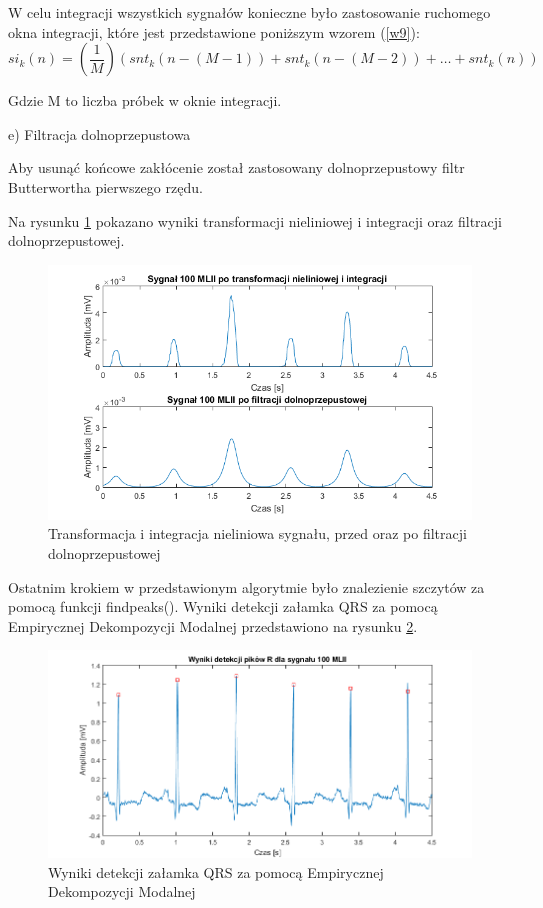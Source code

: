 \documentclass[10pt,a4paper]{article}
\begin{document}
W celu integracji wszystkich sygnałów konieczne było zastosowanie ruchomego
okna integracji, które jest przedstawione poniższym wzorem (\ref{w9}):
\begin{equation}
\label{w10}
si_k(n)=(\frac{1}{M})(snt_k(n-(M-1)) + snt_k(n-(M-2)) + \ldots + snt_k(n))
\end{equation}

Gdzie M to liczba próbek w oknie integracji.


e) Filtracja dolnoprzepustowa

Aby usunąć końcowe zakłócenie został zastosowany dolnoprzepustowy filtr
Butterwortha pierwszego rzędu.

 \vspace{1em}
 
Na rysunku \ref{butter} pokazano wyniki transformacji nieliniowej i integracji oraz filtracji dolnoprzepustowej.

\begin{figure}[h!]
\label{butter}
	\centerline{\includegraphics[width=\textwidth]{trzeci}}
	\caption{Transformacja i integracja nieliniowa sygnału, przed oraz po filtracji dolnoprzepustowej}
\end{figure}
\FloatBarrier

 \vspace{1em}
 \newpage
 Ostatnim krokiem w przedstawionym algorytmie było znalezienie szczytów za pomocą funkcji findpeaks().
 Wyniki detekcji załamka QRS za pomocą Empirycznej Dekompozycji Modalnej przedstawiono na rysunku \ref{ostatni}.

\begin{figure}[h!]
\label{ostatni}
	\centerline{\includegraphics[width=\textwidth]{czwarty}}
	\caption{Wyniki detekcji załamka QRS za pomocą Empirycznej Dekompozycji Modalnej}
\end{figure}
\end{document}
